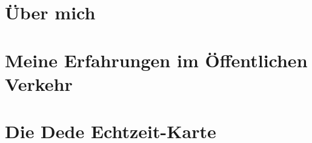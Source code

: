 \documentclass{beamer}
\begin{document}
\begin{frame}
  \titlepage
\end{frame}


\section{Über mich}



\section{Meine Erfahrungen im Öffentlichen Verkehr}



%

\bgroup


%

\egroup

%

%

%

%

%

%

\section{Die Dede Echtzeit-Karte}

%

\bgroup
\end{document}

